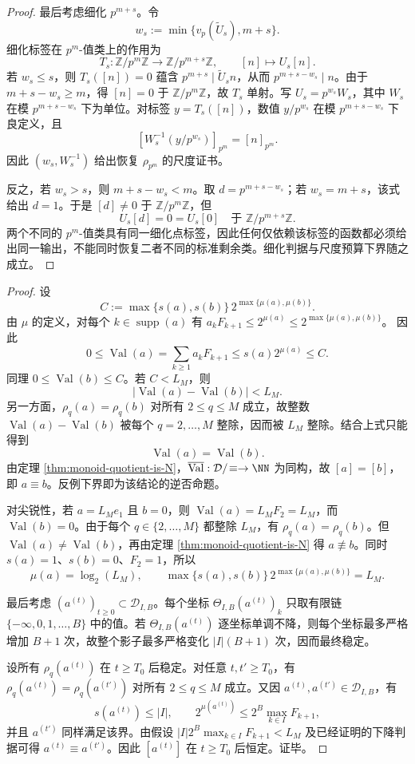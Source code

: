 \begin{proof}
最后考虑细化 \(p^{m+s}\)。令
\[
w_s:=\min\{v_p(\widetilde U_s),m+s\}.
\]
细化标签在 \(p^m\)-值类上的作用为
\[
T_s:\mathbb Z/p^m\mathbb Z\longrightarrow\mathbb Z/p^{m+s}\mathbb Z,
\qquad
[n]\longmapsto U_s[n].
\]
若 \(w_s\le s\)，则 \(T_s([n])=0\) 蕴含 \(p^{m+s}\mid\widetilde U_sn\)，从而 \(p^{m+s-w_s}\mid n\)。由于 \(m+s-w_s\ge m\)，得 \([n]=0\) 于 \(\mathbb Z/p^m\mathbb Z\)，故 \(T_s\) 单射。写 \(U_s=p^{w_s}W_s\)，其中 \(W_s\) 在模 \(p^{m+s-w_s}\) 下为单位。对标签 \(y=T_s([n])\)，数值 \(y/p^{w_s}\) 在模 \(p^{m+s-w_s}\) 下良定义，且
\[
[W_s^{-1}(y/p^{w_s})]_{p^m}=[n]_{p^m}.
\]
因此 \((w_s,W_s^{-1})\) 给出恢复 \(\rho_{p^m}\) 的尺度证书。

反之，若 \(w_s>s\)，则 \(m+s-w_s<m\)。取 \(d=p^{m+s-w_s}\)；若 \(w_s=m+s\)，该式给出 \(d=1\)。于是 \([d]\ne0\) 于 \(\mathbb Z/p^m\mathbb Z\)，但
\[
U_s[d]=0=U_s[0]\quad\text{于 }\mathbb Z/p^{m+s}\mathbb Z.
\]
两个不同的 \(p^m\)-值类具有同一细化点标签，因此任何仅依赖该标签的函数都必须给出同一输出，不能同时恢复二者不同的标准剩余类。细化判据与尺度预算下界随之成立。
\end{proof}

\begin{proof}
设
\[
C:=\max\{s(a),s(b)\}\,2^{\max\{\mu(a),\mu(b)\}}.
\]
由 \(\mu\) 的定义，对每个 \(k\in\operatorname{supp}(a)\) 有
\(
a_kF_{k+1}\le 2^{\mu(a)}\le 2^{\max\{\mu(a),\mu(b)\}}
\)。
因此
\[
0\le \operatorname{Val}(a)
=\sum_{k\ge1}a_kF_{k+1}
\le s(a)2^{\mu(a)}\le C.
\]
同理 \(0\le\operatorname{Val}(b)\le C\)。若 \(C<L_M\)，则
\[
|\operatorname{Val}(a)-\operatorname{Val}(b)|<L_M.
\]
另一方面，\(\rho_q(a)=\rho_q(b)\) 对所有 \(2\le q\le M\) 成立，故整数
\(
\operatorname{Val}(a)-\operatorname{Val}(b)
\)
被每个 \(q=2,\ldots,M\) 整除，因而被 \(L_M\) 整除。结合上式只能得到
\[
\operatorname{Val}(a)=\operatorname{Val}(b).
\]
由定理 \ref{thm:monoid-quotient-is-N}，\(\overline{\operatorname{Val}}:\mathcal D/\!\equiv\to\NN\) 为同构，故 \([a]=[b]\)，即 \(a\equiv b\)。反例下界即为该结论的逆否命题。

对尖锐性，若 \(a=L_Me_1\) 且 \(b=0\)，则 \(\operatorname{Val}(a)=L_MF_2=L_M\)，而 \(\operatorname{Val}(b)=0\)。由于每个 \(q\in\{2,\ldots,M\}\) 都整除 \(L_M\)，有 \(\rho_q(a)=\rho_q(b)\)。但 \(\operatorname{Val}(a)\ne\operatorname{Val}(b)\)，再由定理 \ref{thm:monoid-quotient-is-N} 得 \(a\not\equiv b\)。同时 \(s(a)=1\)、\(s(b)=0\)、\(F_2=1\)，所以
\[
\mu(a)=\log_2(L_M),
\qquad
\max\{s(a),s(b)\}\,2^{\max\{\mu(a),\mu(b)\}}=L_M.
\]

最后考虑 \((a^{(t)})_{t\ge0}\subset\mathcal D_{I,B}\)。每个坐标 \(\Theta_{I,B}(a^{(t)})_k\) 只取有限链
\(
\{-\infty,0,1,\ldots,B\}
\)
中的值。若 \(\Theta_{I,B}(a^{(t)})\) 逐坐标单调不降，则每个坐标最多严格增加 \(B+1\) 次，故整个影子最多严格变化 \(|I|(B+1)\) 次，因而最终稳定。

设所有 \(\rho_q(a^{(t)})\) 在 \(t\ge T_0\) 后稳定。对任意 \(t,t'\ge T_0\)，有
\(
\rho_q(a^{(t)})=\rho_q(a^{(t')})
\)
对所有 \(2\le q\le M\) 成立。又因 \(a^{(t)},a^{(t')}\in\mathcal D_{I,B}\)，有
\[
s(a^{(t)})\le |I|,
\qquad
2^{\mu(a^{(t)})}\le 2^B\max_{k\in I}F_{k+1},
\]
并且 \(a^{(t')}\) 同样满足该界。由假设
\(
|I|2^B\max_{k\in I}F_{k+1}<L_M
\)
及已经证明的下降判据可得
\(
a^{(t)}\equiv a^{(t')}
\)。因此 \([a^{(t)}]\) 在 \(t\ge T_0\) 后恒定。证毕。
\end{proof}

